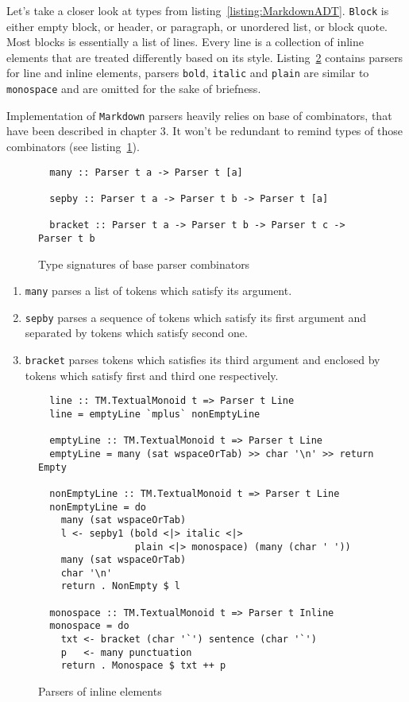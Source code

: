   Let's take a closer look at types from listing~\ref{listing:MarkdownADT}.
  \lstinline{Block} is either empty block, or header, or paragraph, or
  unordered list, or block quote. Most blocks is essentially a list of lines.
  Every line is a collection of inline elements that are treated differently 
  based on its style. Listing~\ref{listing:MarkdownInline} contains parsers for 
  line and inline elements, parsers \lstinline{bold}, \lstinline{italic} and 
  \lstinline{plain} are similar to \lstinline{monospace} and are omitted for 
  the sake of briefness.

  Implementation of \lstinline{Markdown} parsers heavily relies on base of 
  combinators, that have been described in chapter 3. It won't be redundant to
  remind types of those combinators (see listing~\ref{listing:ParserCombinators}).   

  \begin{figure}[h]
  \begin{lstlisting}
  many :: Parser t a -> Parser t [a]

  sepby :: Parser t a -> Parser t b -> Parser t [a]

  bracket :: Parser t a -> Parser t b -> Parser t c -> Parser t b
  \end{lstlisting}
  \caption{Type signatures of base parser combinators}
  \label{listing:ParserCombinators}
  \end{figure}

  \begin{enumerate}
    \item \lstinline{many} parses a list of tokens which satisfy its argument.
    \item \lstinline{sepby} parses a sequence of tokens which satisfy its first 
    argument and separated by tokens which satisfy second one.
    \item \lstinline{bracket} parses tokens which satisfies its third argument 
    and enclosed by tokens which satisfy first and third one respectively.
  \end{enumerate}

  \begin{figure}[t]
  \begin{lstlisting}
  line :: TM.TextualMonoid t => Parser t Line
  line = emptyLine `mplus` nonEmptyLine

  emptyLine :: TM.TextualMonoid t => Parser t Line
  emptyLine = many (sat wspaceOrTab) >> char '\n' >> return Empty

  nonEmptyLine :: TM.TextualMonoid t => Parser t Line
  nonEmptyLine = do
    many (sat wspaceOrTab)
    l <- sepby1 (bold <|> italic <|>
                 plain <|> monospace) (many (char ' '))
    many (sat wspaceOrTab)
    char '\n'
    return . NonEmpty $ l

  monospace :: TM.TextualMonoid t => Parser t Inline
  monospace = do
    txt <- bracket (char '`') sentence (char '`')
    p   <- many punctuation
    return . Monospace $ txt ++ p
  \end{lstlisting}
  \caption{Parsers of inline elements}
  \label{listing:MarkdownInline}
  \end{figure}

